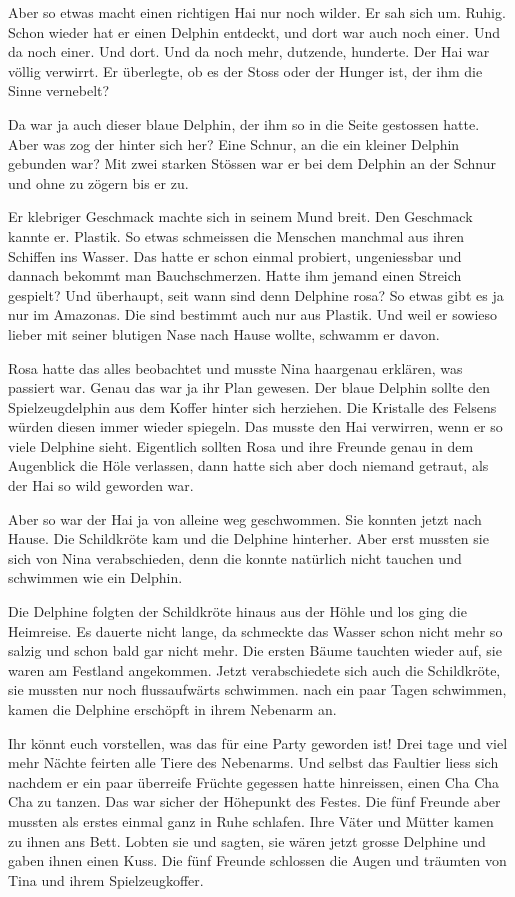 Aber so etwas macht einen richtigen Hai nur noch wilder. Er sah sich um. Ruhig. Schon wieder hat er einen Delphin entdeckt, und dort war auch noch einer. Und da noch einer. Und dort. Und da noch mehr, dutzende, hunderte. Der Hai war völlig verwirrt. Er überlegte, ob es der Stoss oder der Hunger ist, der ihm die Sinne vernebelt?

Da war ja auch dieser blaue Delphin, der ihm so in die Seite gestossen hatte. Aber was zog der hinter sich her? Eine Schnur, an die ein kleiner Delphin gebunden war? Mit zwei starken Stössen war er bei dem Delphin an der Schnur und ohne zu zögern bis er zu.

Er klebriger Geschmack machte sich in seinem Mund breit. Den Geschmack kannte er. Plastik. So etwas schmeissen die Menschen manchmal aus ihren Schiffen ins Wasser. Das hatte er schon einmal probiert, ungeniessbar und dannach bekommt man Bauchschmerzen. Hatte ihm jemand einen Streich gespielt? Und überhaupt, seit wann sind denn Delphine rosa? So etwas gibt es ja nur im Amazonas. Die sind bestimmt auch nur aus Plastik.  Und weil er sowieso lieber mit seiner blutigen Nase nach Hause wollte, schwamm er davon.

Rosa hatte das alles beobachtet und musste Nina haargenau erklären, was passiert war. Genau das war ja ihr Plan gewesen. Der blaue Delphin sollte den Spielzeugdelphin aus dem Koffer hinter sich herziehen. Die Kristalle des Felsens würden diesen immer wieder spiegeln. Das musste den Hai verwirren, wenn er so viele Delphine sieht. Eigentlich sollten Rosa und ihre Freunde genau in dem Augenblick die Höle verlassen, dann hatte sich aber doch niemand getraut, als der Hai so wild geworden war.

Aber so war der Hai ja von alleine weg geschwommen. Sie konnten jetzt nach Hause. Die Schildkröte kam und die Delphine hinterher. Aber erst mussten sie sich von Nina verabschieden, denn die konnte natürlich nicht tauchen und schwimmen wie ein Delphin. 

Die Delphine folgten der Schildkröte hinaus aus der Höhle und los ging die Heimreise. Es dauerte nicht lange, da schmeckte das Wasser schon nicht mehr so salzig und schon bald gar nicht mehr. Die ersten Bäume tauchten wieder auf, sie waren am Festland angekommen. Jetzt verabschiedete sich auch die Schildkröte, sie mussten nur noch flussaufwärts schwimmen. nach ein paar Tagen schwimmen, kamen die Delphine erschöpft in ihrem Nebenarm an.

Ihr könnt euch vorstellen, was das für eine Party geworden ist! Drei tage und viel mehr Nächte feirten alle Tiere des Nebenarms. Und selbst das Faultier liess sich nachdem er ein paar überreife Früchte gegessen hatte hinreissen, einen Cha Cha Cha zu tanzen. Das war sicher der Höhepunkt des Festes. Die fünf Freunde aber mussten als erstes einmal ganz in Ruhe schlafen. Ihre Väter und Mütter kamen zu ihnen ans Bett. Lobten sie und sagten, sie wären jetzt grosse Delphine und gaben ihnen einen Kuss. Die fünf Freunde schlossen die Augen und träumten von Tina und ihrem Spielzeugkoffer.


